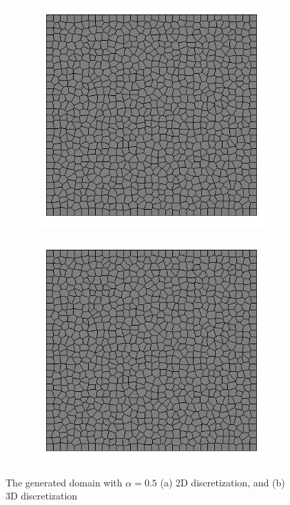 \begin{figure}[!ht]
\begin{subfigure}[c]{0.48\textwidth}
\includegraphics[width=1\textwidth]{figures/Amir_LEM_Domain_2D.png}
\subcaption{}
\label{fig:Amir_LEM_Domain_2D}
\end{subfigure}
\hfill
\begin{subfigure}[c]{0.48\textwidth}
\includegraphics[width=1\textwidth]{figures/Amir_LEM_Domain_3D.png}
\subcaption{}
\label{fig:Amir_LEM_Domain_3D}
\end{subfigure}
\caption{The generated domain with $\alpha = 0.5$ (a) 2D discretization, and (b) 3D discretization}
\end{figure}

